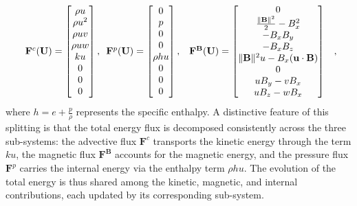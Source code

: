 \documentclass[a4paper,fleqn]{cas-sc}
\theoremstyle{definition}
\theoremstyle{remark}
\begin{document}
\begin{equation}
\label{equ:3_split}
\renewcommand{\arraystretch}{} %
\begin{array}{c}
\mathbf{F}^c(\mathbf{U}) =
\begin{bmatrix}
\rho u \\
\rho u^2\\
\rho u v\\
\rho u w\\
 k u\\
0 \\
0 \\
0
\end{bmatrix}, 
\begin{array}{cc}
\mathbf{F}^p(\mathbf{U}) =
\begin{bmatrix}
0 \\
p \\
0 \\
0 \\
\rho h u\\
0 \\
0 \\
0
\end{bmatrix},
&
\mathbf{F}^\mathbf{B}(\mathbf{U}) =
\begin{bmatrix}
0 \\
\frac{\|\mathbf{B}\|^2}{2} - B_x^2 \\
-B_x B_y \\
-B_x B_z \\
\|\mathbf{B}\|^2 u - B_x (\mathbf{u} \cdot \mathbf{B}) \\
0 \\
u B_y - v B_x \\
u B_z - w B_x
\end{bmatrix}
\end{array}
\end{array},
\end{equation}
where $h = e + \frac{p}{\rho}$ represents the specific enthalpy. A distinctive 
feature of this splitting is that the total energy flux is decomposed consistently 
across the three sub-systems: the advective flux $\mathbf{F}^c$ transports the 
kinetic energy through the term $ku$, the magnetic flux $\mathbf{F}^\mathbf{B}$ 
accounts for the magnetic energy, and the pressure flux $\mathbf{F}^p$ carries the 
internal energy via the enthalpy term $\rho h u$. The evolution of the total energy 
is thus shared among the kinetic, magnetic, and internal contributions, each 
updated by its corresponding sub-system.
\end{document}
